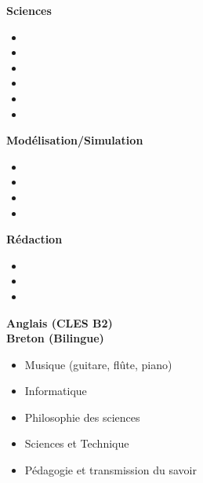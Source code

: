 


\large\textbf{Sciences}

\begin{itemize}
	\item {}
	\item {}
	\item {}
	\item {}
	\item {}
	\item {}
\end{itemize}

\divider

\large\textbf{Modélisation/Simulation}
\begin{itemize}
	\item {}
	\item {}
	\item {}
	\item {}
\end{itemize}

\divider

\large\textbf{Rédaction}
\begin{itemize}
	\item{}
	\item {}
	\item {}
\end{itemize}







\medskip


\textbf{Anglais (CLES B2)}\\
\textbf{Breton (Bilingue)}


\medskip



\begin{itemize}
	\item Musique (guitare, flûte, piano)
	\item Informatique
	\item Philosophie des sciences
	\item Sciences et Technique
	\item Pédagogie et transmission du savoir
\end{itemize}

